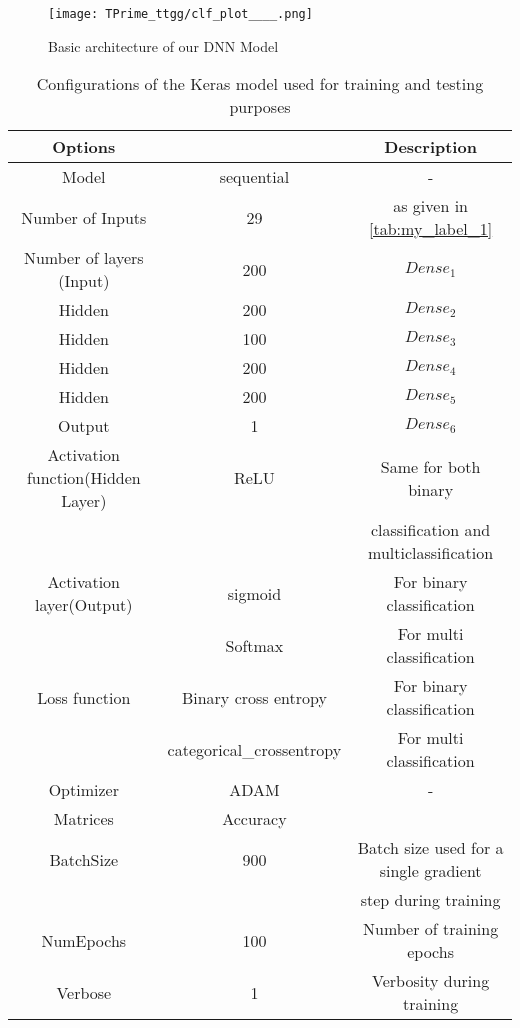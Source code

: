    
 \begin{figure}[H]
     \centering
     \texttt{[image: TPrime\_ttgg/clf\_plot\_\_\_\_.png]}
     \caption{Basic architecture of our DNN Model }
     \label{fig:my_label_arch}
 \end{figure}
 \begin{table}[H]
     \centering
     \begin{tabular}{|ccc|}\hline
       Options   &   & Description \\\hline
    Model      &    sequential  &   -   \\
    Number of Inputs      &    29  &    as given in \autoref{tab:my_label_1}  \\
    Number of layers (Input)     & 200     &  $Dense_1$    \\
        Hidden  &  200    &  $Dense_2$    \\
         Hidden &  100    &   $Dense_3$   \\
        Hidden  & 200     &  $Dense_4$    \\
        Hidden  & 200     & $Dense_5$     \\
        Output  & 1      &  $Dense_6$    \\
    Activation function(Hidden Layer)      &  ReLU    &   Same for both binary\\  
    & & classification and multiclassification   \\
      Activation layer(Output)    & sigmoid     &  For binary classification    \\
                                  &  Softmax  & For multi classification    \\
    Loss function   &   Binary cross entropy    & For binary classification \\
                    &    categorical\_crossentropy  & For multi classification \\
    Optimizer      &     ADAM     &     -\\
    Matrices     & Accuracy    &  \\
    BatchSize      & 900  & Batch size used for a single gradient  \\
                      &    &     step during training  \\
    NumEpochs      & 100 &   Number of training epochs \\
    Verbose &    1  &  Verbosity during training \\\hline
    
     \end{tabular}
     \caption{Configurations of the Keras model used for training and testing purposes}
     \label{tab:my_label_00}
 \end{table}
   
